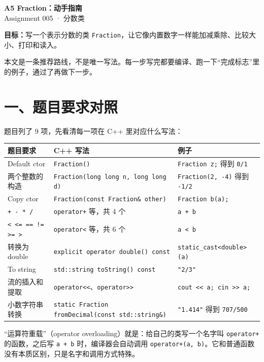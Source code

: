 \documentclass[11pt,a4paper]{article}
\newcommand{\code}[1]{\texttt{#1}}
\begin{document}
\sloppy
\setlength{\emergencystretch}{3em}

\begin{center}
  {\LARGE\bfseries A5 Fraction：动手指南}\\[0.8ex]
  {\normalsize Assignment 005 · 分数类}
\end{center}

\textbf{目标：}写一个表示分数的类 \code{Fraction}，让它像内置数字一样能加减乘除、比较大小、打印和读入。

本文是一条推荐路线，不是唯一写法。每一步写完都要编译、跑一下“完成标志”里的例子，通过了再做下一步。

\section{一、题目要求对照}

题目列了 9 项，先看清每一项在 C++ 里对应什么写法：

\begin{center}
\small
\begin{tabularx}{\linewidth}{@{}>{\raggedright\arraybackslash}p{3.3cm}>{\raggedright\arraybackslash}X>{\raggedright\arraybackslash}p{4.6cm}@{}}
\toprule
题目要求 & C++ 写法 & 例子 \\
\midrule
Default ctor & \code{Fraction()} & \code{Fraction z;} 得到 \code{0/1} \\
两个整数的构造 & \code{Fraction(long long n, long long d)} & \code{Fraction(2, -4)} 得到 \code{-1/2} \\
Copy ctor & \code{Fraction(const Fraction\& other)} & \code{Fraction b(a);} \\
\code{+ - * /} & \code{operator+} 等，共 4 个 & \code{a + b} \\
\code{< <= == != >= >} & \code{operator<} 等，共 6 个 & \code{a < b} \\
转换为 double & \code{explicit operator double() const} & \code{static\_cast<double>(a)} \\
To string & \code{std::string toString() const} & \code{"2/3"} \\
流的插入和提取 & \code{operator<<}、\code{operator>>} & \code{cout << a;}\ \code{cin >> a;} \\
小数字符串转换 & \code{static Fraction fromDecimal(const std::string\&)} & \code{"1.414"} 得到 \code{707/500} \\
\bottomrule
\end{tabularx}
\end{center}

“运算符重载”（operator overloading）就是：给自己的类写一个名字叫 \code{operator+} 的函数，之后写 \code{a + b} 时，编译器会自动调用 \code{operator+(a, b)}。它和普通函数没有本质区别，只是名字和调用方式特殊。
\end{document}
